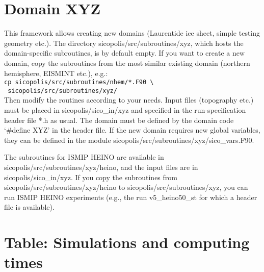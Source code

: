 \documentclass[12pt,a4paper]{article}
\begin{document}
\begin{appendix}

\section{Domain XYZ}
\label{sect_xyz}

This framework allows creating new domains (Laurentide ice sheet, simple testing geometry etc.). The directory sicopolis/src/subroutines/xyz, which hosts the domain-specific subroutines, is by default empty. If you want to create a new domain, copy the subroutines from the most similar existing domain (northern hemisphere, EISMINT etc.), e.g.:
\\
\hspace*{10mm}\verb+cp sicopolis/src/subroutines/nhem/*.F90 \+
\\[-0.5ex]
\hspace*{14.3mm}\verb+ sicopolis/src/subroutines/xyz/ +
\\
Then modify the routines according to your needs. Input files (topography etc.) must be placed in sicopolis/sico\_in/xyz and specified in the run-specification header file *.h as usual. The domain must be defined by the domain code `\#define XYZ' in the header file. If the new domain requires new global variables, they can be defined in the module sicopolis/src/subroutines/xyz/sico\_vars.F90.

The subroutines for ISMIP HEINO are available in sicopolis/src/subroutines/xyz/heino, and the input files are in sicopolis/sico\_in/xyz. If you copy the subroutines from sicopo\-lis/src/subroutines/xyz/heino to sicopolis/src/subroutines/xyz, you can run ISMIP HEINO experiments (e.g., the run v5\_heino50\_st for which a header file is available).

\vfill

\clearpage

\section{Table: Simulations and computing times}
\label{sect_table}


\end{appendix}
\end{document}
